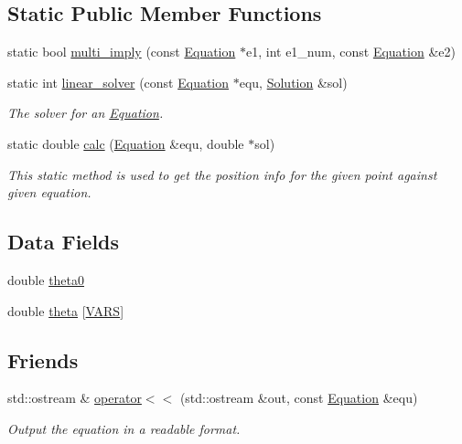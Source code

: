 \subsection*{Static Public Member Functions}
\begin{DoxyCompactItemize}
\item 
static bool \hyperlink{classEquation_a1a53efa4ba6e185558de78f1065ab375}{multi\+\_\+imply} (const \hyperlink{classEquation}{Equation} $\ast$e1, int e1\+\_\+num, const \hyperlink{classEquation}{Equation} \&e2)
\item 
static int \hyperlink{classEquation_a061e5066dffec79ea306546da919ddbf}{linear\+\_\+solver} (const \hyperlink{classEquation}{Equation} $\ast$equ, \hyperlink{classSolution}{Solution} \&sol)
\begin{DoxyCompactList}\small\item\em The solver for an \hyperlink{classEquation}{Equation}. \end{DoxyCompactList}\item 
static double \hyperlink{classEquation_ada446e2cdda9e86007ae08a4c0f6537a}{calc} (\hyperlink{classEquation}{Equation} \&equ, double $\ast$sol)
\begin{DoxyCompactList}\small\item\em This static method is used to get the position info for the given point against given equation. \end{DoxyCompactList}\end{DoxyCompactItemize}
\subsection*{Data Fields}
\begin{DoxyCompactItemize}
\item 
double \hyperlink{classEquation_aa3da62783d229956703741c758b6fd69}{theta0}
\item 
double \hyperlink{classEquation_af346bba0364be7c84ebc969061d0315f}{theta} \mbox{[}\hyperlink{config_8h_a1d6565a8ececd15de44965eec4790919}{V\+A\+RS}\mbox{]}
\end{DoxyCompactItemize}
\subsection*{Friends}
\begin{DoxyCompactItemize}
\item 
std\+::ostream \& \hyperlink{classEquation_a63697c4e5c47b42ace2f45f59c923108}{operator$<$$<$} (std\+::ostream \&out, const \hyperlink{classEquation}{Equation} \&equ)
\begin{DoxyCompactList}\small\item\em Output the equation in a readable format. \end{DoxyCompactList}\end{DoxyCompactItemize}


